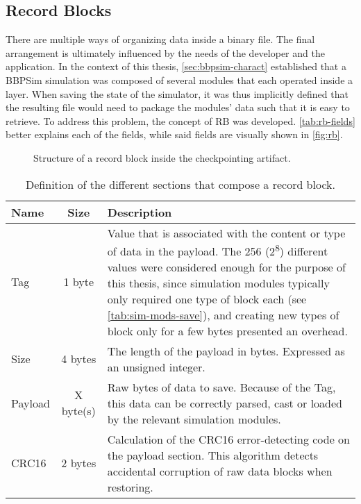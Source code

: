 {\subsection*{Record Blocks}
There are multiple ways of organizing data inside a binary file. The final arrangement is ultimately influenced by the needs of the developer and the application. In the context of this thesis, \autoref{sec:bbpsim-charact} established that a BBPSim simulation was composed of several modules that each operated inside a layer. When saving the state of the simulator, it was thus implicitly defined that the resulting file would need to package the modules' data such that it is easy to retrieve. To address this problem, the concept of \gls{RB} was developed. \autoref{tab:rb-fields} better explains each of the fields, while said fields are visually shown in \autoref{fig:rb}.

\begin{figure}[h]
	\vspace{6pt}
	\small
	\centering
	
	\caption{Structure of a record block inside the checkpointing artifact.}
	\label{fig:rb}
\end{figure}

\begin{table}[h]
	\vspace{12pt}
	\centering
	\begin{tabularx}{\linewidth}{l c X}
		\toprule
		{\bfseries Name}&{\bfseries Size}&{\bfseries Description}\\
		\midrule
		Tag & 1 byte & Value that is associated with the content or type of data in the payload. The 256 (2\textsuperscript{8}) different values were considered enough for the purpose of this thesis, since simulation modules typically only required one type of block each (see \autoref{tab:sim-mods-save}), and creating new types of block only for a few bytes presented an overhead.\\
		\midrule
		Size & 4 bytes & The length of the payload in bytes. Expressed as an unsigned integer.\\
		\midrule
		Payload & {X byte(s)} & Raw bytes of data to save. Because of the Tag, this data can be correctly parsed, cast or loaded by the relevant simulation modules.\\
		\midrule
		CRC16 & 2 bytes & Calculation of the CRC16 error-detecting code on the payload section. This algorithm detects accidental corruption of raw data blocks when restoring.\\
		\bottomrule	
	\end{tabularx}
	\caption{Definition of the different sections that compose a record block.}
	\label{tab:rb-fields}
\end{table}

}
